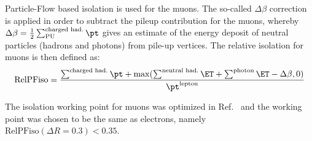 Particle-Flow based isolation is  used for the muons.
The so-called $\Delta\beta$ correction is applied in order to subtract the pileup contribution for the muons, 
whereby $\Delta\beta = \frac{1}{2} \sum^\text{charged had.}_\text{PU} \pt$  gives an estimate of the energy deposit of neutral particles (hadrons and photons) from pile-up vertices. 
The relative isolation for muons is then defined as:
\begin{equation}
\text{RelPFiso} = \frac{\sum^\text{charged had.} \pt + \max(\sum^\text{neutral had.} \ET 
+ \sum^\text{photon} \ET - \Delta \beta, 0)}{\pt^\text{lepton}}
\label{eqn:mupfiso}
\end{equation}

The isolation working point for muons was optimized in Ref.~\cite{AN-15-277} and the working point was chosen to be the same as electrons,
namely $\text{RelPFiso}(\Delta R = 0.3) < 0.35$. 

